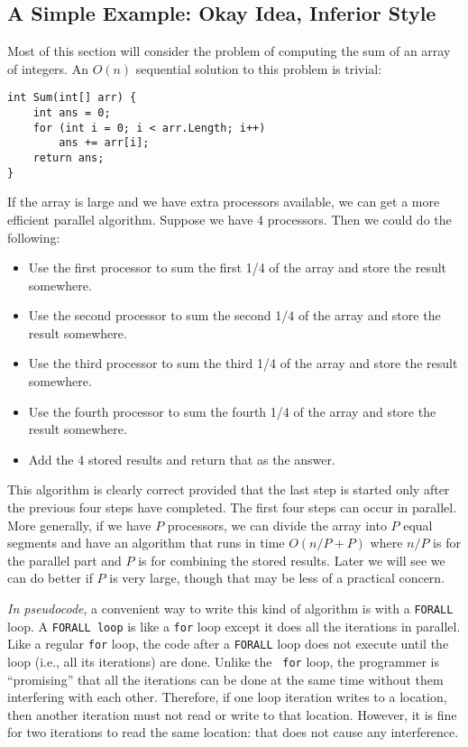 \documentclass[10pt]{article}
\begin{document}
\subsection{A Simple Example: Okay Idea, Inferior Style}
\label{sec:csharp-threads}

Most of this section will consider the problem of computing the sum of
an array of integers.  An $O(n)$ sequential solution to this problem
is trivial:
\begin{verbatim}
int Sum(int[] arr) {
    int ans = 0;
    for (int i = 0; i < arr.Length; i++)
        ans += arr[i];
    return ans;
}
\end{verbatim}
If the array is large and we have extra processors available, we can
get a more efficient parallel algorithm.  Suppose we have 4
processors.  Then we could do the following:
\begin{itemize}
\item Use the first processor to sum the first 1/4 of the array and
  store the result somewhere.
\item Use the second processor to sum the second 1/4 of the array and
  store the result somewhere.
\item Use the third processor to sum the third 1/4 of the array and
  store the result somewhere.
\item Use the fourth processor to sum the fourth 1/4 of the array and
  store the result somewhere.
\item Add the 4 stored results and return that as the answer.
\end{itemize}
This algorithm is clearly correct provided that the last step is
started only after the previous four steps have completed.  
The first four steps can occur in parallel.  More generally,
if we have $P$ processors, we can divide the array into $P$ equal
segments and have an algorithm that runs in time $O(n/P + P)$ where
$n/P$ is for the parallel part and $P$ is for combining the stored
results.  Later we will see we can do better if $P$ is very large,
though that may be less of a practical concern.

\emph{In pseudocode}, a convenient way to write this kind of algorithm
is with a {\tt FORALL} loop.  A {\tt FORALL loop} is like a {\tt for}
loop except it does all the iterations in parallel.  Like a regular
{\tt for} loop, the code after a {\tt FORALL} loop does not execute
until the loop (i.e., all its iterations) are done.  Unlike the {\tt
  for} loop, the programmer is ``promising'' that all the iterations
can be done at the same time without them interfering with each
other.  Therefore, if one loop iteration writes to a location, then
another iteration must not read or write to that location.  However,
it is fine for two iterations to read the same location: that does not
cause any interference.
\end{document}
